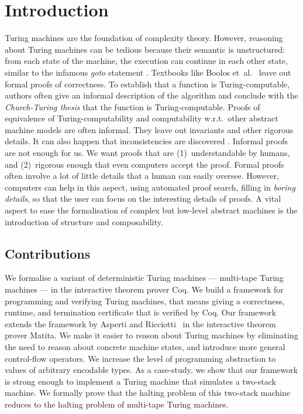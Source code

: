 \chapter{Introduction}
\label{chap:intro}


Turing machines are the foundation of complexity theory.  However, reasoning about Turing machines can be tedious because their semantic is
unstructured: from each state of the machine, the execution can continue in each other state, similar to the infamous \textit{goto} statement
\cite{dijkstra2002go}.  Textbooks like Boolos et~al.~\cite{boolos2007computability} leave out formal proofs of correctness.  To establish that a
function is Turing-computable, authors often give an informal description of the algorithm and conclude with the \textit{Church-Turing thesis} that
the function is Turing-computable.  Proofs of equivalence of Turing-computability and computability w.r.t.\ other abstract machine models are often
informal.  They leave out invariants and other rigorous details.  It can also happen that inconsistencies are discovered
\cite{Xu:2013:MTM:2529315.2529331}.  Informal proofs are not enough for us.  We want proofs that are (1)~understandable by humans, and (2)~rigorous
enough that even computers accept the proof.  Formal proofs often involve a lot of little details that a human can easily oversee.  However, computers
can help in this aspect, using automated proof search, filling in \textit{boring details}, so that the user can focus on the interesting details of
proofs.  A vital aspect to ease the formalisation of complex but low-level abstract machines is the introduction of structure and composability.


\section{Contributions}
\label{sec:contributions}

We formalise a variant of deterministic Turing machines --- multi-tape Turing machines --- in the interactive theorem prover Coq.  We build a
framework for programming and verifying Turing machines, that means giving a correctness, runtime, and termination certificate that is verified by
Coq.  Our framework extends the framework by Asperti and Ricciotti~\cite{asperti2015} in the interactive theorem prover Matita.  We make it easier to
reason about Turing machines by eliminating the need to reason about concrete machine states, and introduce more general control-flow operators.  We
increase the level of programming abstraction to values of arbitrary encodable types.  As a case-study, we show that our framework is strong enough to
implement a Turing machine that simulates a two-stack machine.  We formally prove that the halting problem of this two-stack machine reduces to the
halting problem of multi-tape Turing machines.

